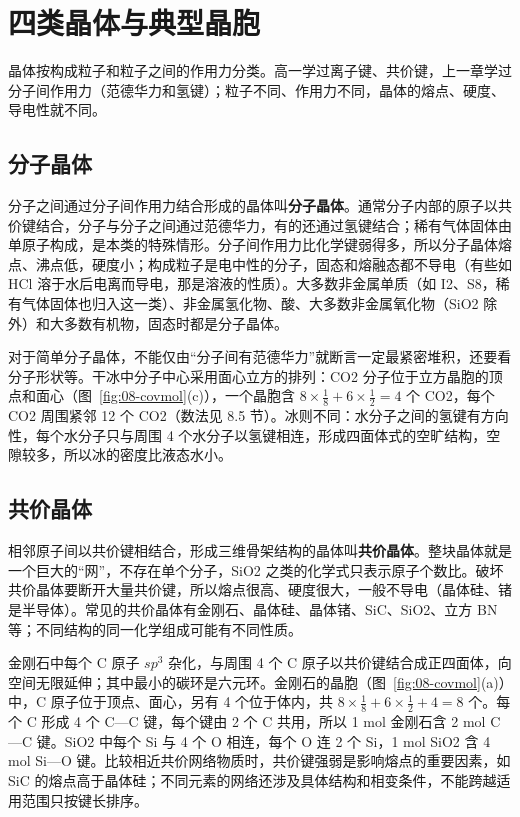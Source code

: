 \documentclass[UTF8,a4paper,zihao=5,oneside,openany,fontset=none]{ctexbook}
\def\mathrm#1{#1}\def\text#1{#1}\def\ensuremath#1{#1}\def\ce#1{#1}%
\begin{document}
\section{四类晶体与典型晶胞}

晶体按构成粒子和粒子之间的作用力分类。高一学过离子键、共价键，上一章学过分子间作用力（范德华力和氢键）；粒子不同、作用力不同，晶体的熔点、硬度、导电性就不同。

\subsection{分子晶体}

分子之间通过分子间作用力结合形成的晶体叫\textbf{分子晶体}。通常分子内部的原子以共价键结合，分子与分子之间通过范德华力，有的还通过氢键结合；稀有气体固体由单原子构成，是本类的特殊情形。分子间作用力比化学键弱得多，所以分子晶体熔点、沸点低，硬度小；构成粒子是电中性的分子，固态和熔融态都不导电（有些如 HCl 溶于水后电离而导电，那是溶液的性质）。大多数非金属单质（如 \ce{I2}、\ce{S8}，稀有气体固体也归入这一类）、非金属氢化物、酸、大多数非金属氧化物（\ce{SiO2} 除外）和大多数有机物，固态时都是分子晶体。

对于简单分子晶体，不能仅由“分子间有范德华力”就断言一定最紧密堆积，还要看分子形状等。干冰中分子中心采用面心立方的排列：\ce{CO2} 分子位于立方晶胞的顶点和面心（图~\ref{fig:08-covmol}(c)），一个晶胞含 $8\times\frac18+6\times\frac12=4$ 个 \ce{CO2}，每个 \ce{CO2} 周围紧邻 12 个 \ce{CO2}（数法见 8.5 节）。冰则不同：水分子之间的氢键有方向性，每个水分子只与周围 4 个水分子以氢键相连，形成四面体式的空旷结构，空隙较多，所以冰的密度比液态水小。

\subsection{共价晶体}

相邻原子间以共价键相结合，形成三维骨架结构的晶体叫\textbf{共价晶体}。整块晶体就是一个巨大的“网”，不存在单个分子，\ce{SiO2} 之类的化学式只表示原子个数比。破坏共价晶体要断开大量共价键，所以熔点很高、硬度很大，一般不导电（晶体硅、锗是半导体）。常见的共价晶体有金刚石、晶体硅、晶体锗、SiC、\ce{SiO2}、立方 BN 等；不同结构的同一化学组成可能有不同性质。

金刚石中每个 C 原子 $\mathrm{sp}^3$ 杂化，与周围 4 个 C 原子以共价键结合成正四面体，向空间无限延伸；其中最小的碳环是六元环。金刚石的晶胞（图~\ref{fig:08-covmol}(a)）中，C 原子位于顶点、面心，另有 4 个位于体内，共 $8\times\frac18+6\times\frac12+4=8$ 个。每个 C 形成 4 个 C—C 键，每个键由 2 个 C 共用，所以 1 mol 金刚石含 2 mol C—C 键。\ce{SiO2} 中每个 Si 与 4 个 O 相连，每个 O 连 2 个 Si，1 mol \ce{SiO2} 含 4 mol Si—O 键。比较相近共价网络物质时，共价键强弱是影响熔点的重要因素，如 SiC 的熔点高于晶体硅；不同元素的网络还涉及具体结构和相变条件，不能跨越适用范围只按键长排序。
\end{document}
